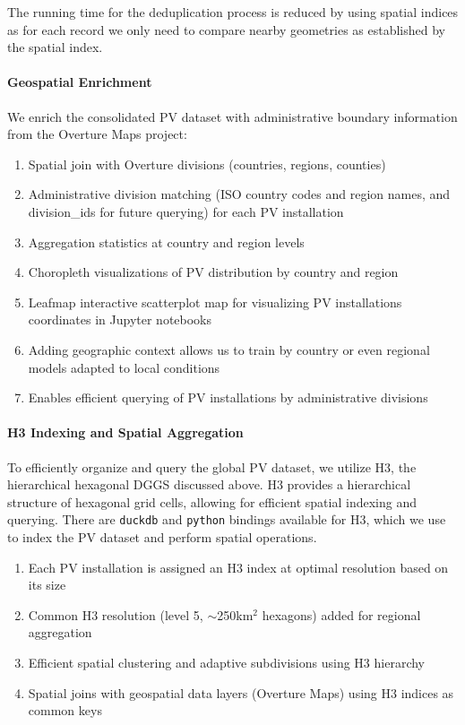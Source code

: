 The running time for the deduplication process is reduced by using spatial indices as for each record we only need to compare nearby geometries as established by the spatial index.


\paragraph{Geospatial Enrichment}
We enrich the consolidated PV dataset with administrative boundary information from the Overture Maps project:
\begin{enumerate}
    \item Spatial join with Overture divisions (countries, regions, counties)
    \item Administrative division matching (ISO country codes and region names, and division\_ids for future querying) for each PV installation
    \item Aggregation statistics at country and region levels
    \item Choropleth visualizations of PV distribution by country and region
    \item Leafmap interactive scatterplot map for visualizing PV installations coordinates in Jupyter notebooks
    \item Adding geographic context allows us to train by country or even regional models adapted to local conditions
    \item Enables efficient querying of PV installations by administrative divisions
\end{enumerate}

\paragraph{H3 Indexing and Spatial Aggregation}
To efficiently organize and query the global PV dataset, we utilize H3, the hierarchical hexagonal DGGS discussed above.
H3 provides a hierarchical structure of hexagonal grid cells, allowing for efficient spatial indexing and querying. There are \texttt{duckdb} and \texttt{python} bindings available for H3,
which we use to index the PV dataset and perform spatial operations.
\begin{enumerate}
    \item Each PV installation is assigned an H3 index at optimal resolution based on its size
    \item Common H3 resolution (level 5, $\sim$250km$^2$ hexagons) added for regional aggregation
    \item Efficient spatial clustering and adaptive subdivisions using H3 hierarchy
    \item Spatial joins with geospatial data layers (Overture Maps) using H3 indices as common keys
\end{enumerate}

